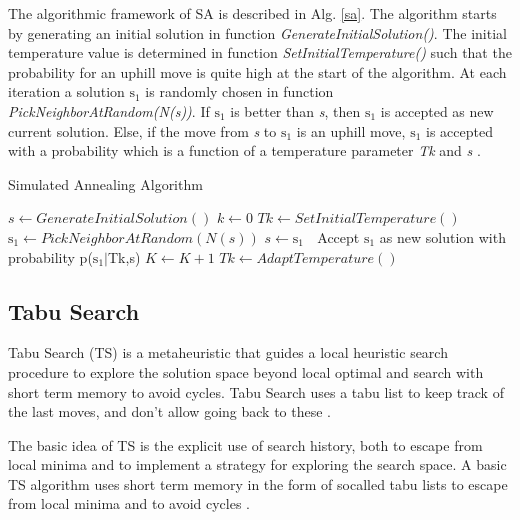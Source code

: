 The algorithmic framework of SA is described in Alg. \ref{sa}.  The algorithm starts by generating an initial solution in function \textit{GenerateInitialSolution()}. The initial temperature value is determined in function \textit{SetInitialTemperature()} such that the probability for an uphill move is quite high at the start of the algorithm. At each iteration a solution $\mbox{s}_1$ is randomly chosen in function \textit{PickNeighborAtRandom(N(s))}. If \textit{$\mbox{s}_1$} is better than \textit{s}, then \textit{$\mbox{s}_1$} is accepted as new current solution. Else, if the move from \textit{s} to \textit{$\mbox{s}_1$} is an uphill move, \textit{$\mbox{s}_1$}  is accepted with a probability which is a function of a temperature parameter \textit{Tk} and \textit{s} \cite{raidl2010metaheuristic}. 

\begin{algorithm}[h]
  \caption{Simulated Annealing Algorithm}\label{sa}
  \begin{algorithmic}[1]
    
    \State $s\gets GenerateInitialSolution()$
    \State $k\gets 0 $
    \State $Tk\gets SetInitialTemperature()$
    \State $\mbox{s}_1\gets PickNeighborAtRandom(N (s))$
    \State $s\gets\mbox{s}_1$
    \Else $\;$ Accept $\mbox{s}_1$ as new solution with probability p($\mbox{s}_1|$Tk,s) 
    \EndIf
    \State $K\gets K+1$
    \State $Tk\gets AdaptTemperature()$
    \EndWhile
      
  \end{algorithmic}
\end{algorithm}

\subsection{Tabu Search}

Tabu Search (TS) is a metaheuristic that guides a local heuristic search procedure to explore the solution space beyond local optimal and search with short term memory to avoid cycles. Tabu Search uses a  tabu list to keep track of the last  moves, and don’t allow going back to these \cite{Glover1986}.

The basic idea of TS is the explicit use of search history, both to escape
from local minima and to implement a strategy for exploring the search space.
A basic TS algorithm uses short term memory in the form of socalled
tabu lists to escape from local minima and to avoid cycles \cite{Tobergte2013}.

